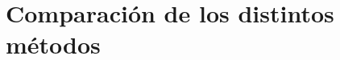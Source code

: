 \documentclass[a4paper]{article}
\begin{document}
\newpage
\section{Comparación de los distintos métodos}

%
%
%
%
%
%
%
%
\end{document}

